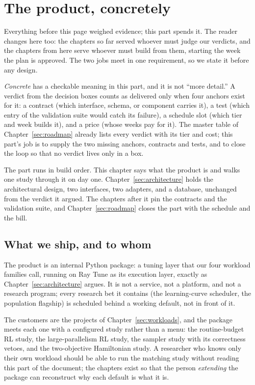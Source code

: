 \chapter{The product, concretely}
\label{sec:product}

Everything before this page weighed evidence; this part spends it. The
reader changes here too: the chapters so far served whoever must judge
our verdicts, and the chapters from here serve whoever must build from
them, starting the week the plan is approved. The two jobs meet in one
requirement, so we state it before any design.

\emph{Concrete} has a checkable meaning in this part, and it is not
``more detail.'' A verdict from the decision boxes counts as delivered
only when four anchors exist for it: a contract (which interface,
schema, or component carries it), a test (which entry of the
validation suite would catch its failure), a schedule slot (which tier
and week builds it), and a price (whose weeks pay for it). The master
table of Chapter~\ref{sec:roadmap} already lists every verdict with
its tier and cost; this part's job is to supply the two missing
anchors, contracts and tests, and to close the loop so that no
verdict lives only in a box.

The part runs in build order. This chapter says what the product is
and walks one study through it on day one.
Chapter~\ref{sec:architecture} holds the architectural design, two
interfaces, two adapters, and a database, unchanged from the verdict
it argued. The chapters after it pin the contracts and the validation
suite, and Chapter~\ref{sec:roadmap} closes the part with the
schedule and the bill.

\section{What we ship, and to whom}

The product is an internal Python package: a tuning layer that our
four workload families call, running on Ray Tune as its execution
layer, exactly as Chapter~\ref{sec:architecture} argues. It is not a
service, not a platform, and not a research program; every research
bet it contains (the learning-curve scheduler, the population
flagship) is scheduled behind a working default, not in front of it.

The customers are the projects of Chapter~\ref{sec:workloads}, and
the package meets each one with a configured study rather than a menu:
the routine-budget RL study, the large-parallelism RL study, the
sampler study with its correctness vetoes, and the two-objective
Hamiltonian study. A researcher who knows only their own workload
should be able to run the matching study without reading this part
of the document; the chapters exist so that the person
\emph{extending} the package can reconstruct why each default is what
it is.


